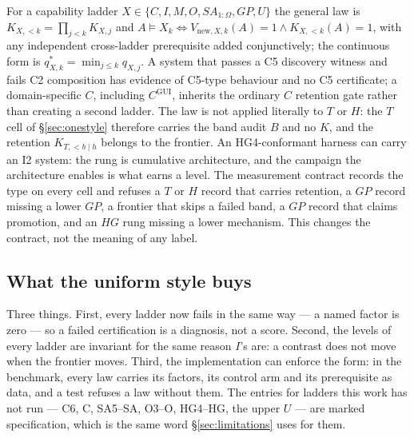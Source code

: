 For a capability ladder $X \in \{C, I, M, O, SA_{1:\Omega}, GP, U\}$ the general law is $K_{X,<k} = \prod_{j<k} K_{X,j}$ and $A \models X_k \iff V_{\mathrm{new},X,k}(A) = 1 \wedge K_{X,<k}(A) = 1$, with any independent cross-ladder prerequisite added conjunctively; the continuous form is $q^{*}_{X,k} = \min_{j \le k} q_{X,j}$. A system that passes a C5 discovery witness and fails C2 composition has evidence of C5-type behaviour and no C5 certificate; a domain-specific $C$, including $C^{\mathrm{GUI}}$, inherits the ordinary $C$ retention gate rather than creating a second ladder. The law is not applied literally to $T$ or $H$: the $T$ cell of \S\ref{sec:onestyle} therefore carries the band audit $B$ and no $K$, and the retention $K_{T,<b\mid h}$ belongs to the frontier. An HG4-conformant harness can carry an I2 system: the rung is cumulative architecture, and the campaign the architecture enables is what earns a level. The measurement contract records the type on every cell and refuses a $T$ or $H$ record that carries retention, a $GP$ record missing a lower $GP$, a frontier that skips a failed band, a $GP$ record that claims promotion, and an $HG$ rung missing a lower mechanism. This changes the contract, not the meaning of any label.

\subsection{What the uniform style buys}
Three things. First, every ladder now fails in the same way --- a named factor is zero --- so a failed certification is a diagnosis, not a score. Second, the levels of every ladder are invariant for the same reason $I$'s are: a contrast does not move when the frontier moves. Third, the implementation can enforce the form: in the benchmark, every law carries its factors, its control arm and its prerequisite as data, and a test refuses a law without them. The entries for ladders this work has not run --- C6, C\Om{}, SA5--SA\Om{}, O3--O\Om{}, HG4--HG\Om{}, the upper $U$ --- are marked specification, which is the same word \S\ref{sec:limitations} uses for them.

